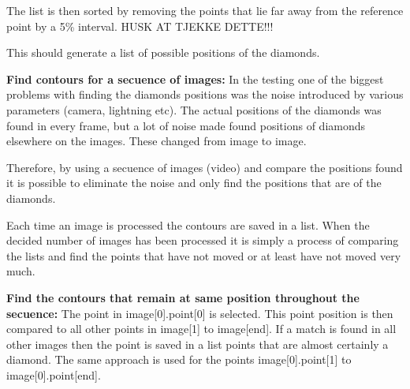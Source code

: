 The list is then sorted by removing the points that lie far away from the reference point by a 5\% interval. HUSK AT TJEKKE DETTE!!!

This should generate a list of possible positions of the diamonds.

\textbf{Find contours for a secuence of images:}
In the testing one of the biggest problems with finding the diamonds positions was the noise introduced by various parameters (camera, lightning etc). The actual positions of the diamonds was found in every frame, but a lot of noise made found positions of diamonds elsewhere on the images. These changed from image to image.

Therefore, by using a secuence of images (video) and compare the positions found it is possible to eliminate the noise and only find the positions that are of the diamonds.

Each time an image is processed the contours are saved in a list. When the decided number of images has been processed it is simply a process of comparing the lists and find the points that have not moved or at least have not moved very much.

\textbf{Find the contours that remain at same position throughout the secuence:}
The point in image[0].point[0] is selected. This point position is then compared to all other points in image[1] to image[end]. If a match is found in all other images then the point is saved in a list points that are almost certainly a diamond. The same approach is used for the points image[0].point[1] to image[0].point[end].
